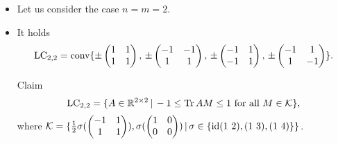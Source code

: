 \begin{frame}
	\begin{itemize}
		\item<1-> Let us consider the case $ n=m=2 $.
		\item <2-> It holds 
		\begin{align*}
		\textup{LC}_{2,2}= \textup{conv} \{ \pm \begin{pmatrix}
		1 & 1 \\
		1 & 1
		\end{pmatrix} , \, \pm \begin{pmatrix}
		-1 & -1 \\
		1 & 1
		\end{pmatrix} , \, \pm \begin{pmatrix}
		-1 & 1 \\
		-1 & 1
		\end{pmatrix}, \, \pm \begin{pmatrix}
		-1 & 1 \\
		1 & -1
		\end{pmatrix}  \}.
		\end{align*}
		\pause
		\begin{block}{Claim}
			\begin{equation}\label{facetsLC}
			\textup{LC}_{2,2} = \{ A \in \mathbb{R}^{2 \times 2} \, | \, -1 \le  \text{Tr} \, {AM}  \le 1 \textup{ for all } M \in \mathcal{K} \},
			\end{equation}
			where $ \mathcal{K}  = \{ \frac{1}{2}\sigma(\begin{pmatrix}
			-1 & 1 \\
			1 & 1
			\end{pmatrix}), \sigma(\begin{pmatrix}
			1 & 0 \\
			0 & 0
			\end{pmatrix}) \, | \,  \sigma \in \{ \textup{id} (1 \, \, 2), (1 \, \, 3), (1 \, \, 4) \} \} $.
		\end{block}
	\end{itemize}
\end{frame}


